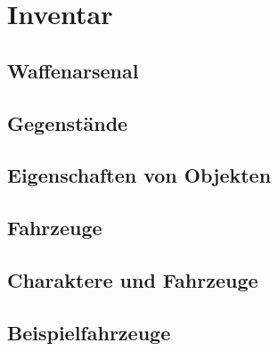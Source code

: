 \chapter{Inventar}
\section{Waffenarsenal}
\section{Gegenstände}
\section{Eigenschaften von Objekten}
\section{Fahrzeuge}
\section{Charaktere und Fahrzeuge}
\section{Beispielfahrzeuge}
